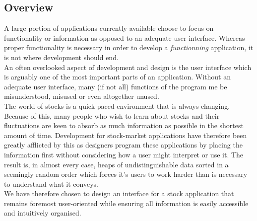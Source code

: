 \documentclass{sigchi}
\begin{document}
\subsection{Overview}
A large portion of applications currently available choose to focus on functionality or information as opposed to an adequate user interface. Whereas proper functionality is necessary in order to develop a \textit{functionning} application, it is not where development should end. \\
An often overlooked aspect of development and design is the user interface which is arguably one of the most important parts of an application. Without an adequate user interface, many (if not all) functions of the program me be misunderstood, misused or even altogether unused. \\
The world of stocks is a quick paced environment that is always changing. Because of this, many people who wish to learn about stocks and their fluctuations are keen to absorb as much information as possible in the shortest amount of time. Development for stock-market applications have therefore been greatly afflicted by this as designers program these applications by placing the information first without considering how a user might interpret or use it. The result is, in almost every case, heaps of undistinguishable data sorted in a seemingly random order which forces it's users to work harder than is necessary to understand what it conveys. \\
We have therefore chosen to design an interface for a stock application that remains foremost user-oriented while ensuring all information is easily accessible and intuitively organised. 
\end{document}
